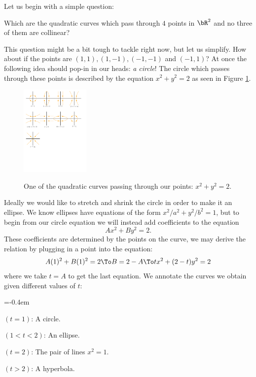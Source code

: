 \documentclass[12pt]{memoir}
\begin{document}
    Let us begin with a simple question:
    \begin{significant}
        Which are the quadratic curves which pass through $4$ points in $\bR^2$ and no three of them are collinear?
    \end{significant}
    This question might be a bit tough to tackle right now, but let us simplify. How about if the points are $(1,1),(1,-1),(-1,-1)$ and $(-1,1)$? At once the following idea should pop-in in our heads: \emph{a circle}! The circle which passes through these points is described by the equation $x^2+y^2=2$ as seen in Figure \ref{fig1}.
    \begin{figure}[h!]
        \centering
        \includegraphics[width=0.3\textwidth, trim= 0.8cm 22.9cm 16cm 0.6cm,clip]{fig1.pdf}
        \label{fig1}
        \caption{One of the quadratic curves passing through our points: $x^2+y^2=2$.}
    \end{figure}
    Ideally we would like to stretch and shrink the circle in order to make it an ellipse. We know ellipses have equations of the form $x^2/a^2+y^2/b^2=1$, but to begin from our circle equation we will instead add coefficients to the equation 
    $$Ax^2+By^2=2.$$
    These coefficients are determined by the points on the curve, we may derive the relation by plugging in a point into the equation:
    $$A(1)^2+B(1)^2=2\To B=2-A\To tx^2+(2-t)y^2=2$$
    where we take $t=A$ to get the last equation.
    We annotate the curves we obtain given different values of $t$:
    \vspace{-0.5em}
    \begin{itemize}
        \begin{multicols}{2}
            \itemsep=-0.4em
        \item $(t=1)$: A circle.
        \item $(1<t<2)$: An ellipse.
        \item $(t=2)$: The pair of lines $x^2=1$.
        \item $(t>2)$: A hyperbola.
        \end{multicols}
    \end{itemize}
\end{document}
